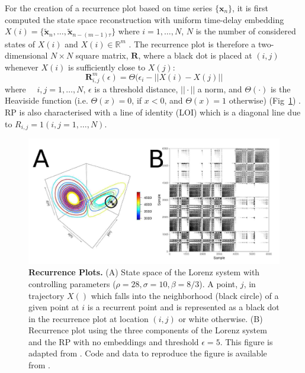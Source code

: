 \documentclass[fleqn,10pt]{wlscirep}
\begin{document}
For the creation of a recurrence plot based on time series 
$\{ \boldsymbol{x}_n \}$, it is first computed the state space 
reconstruction with uniform time-delay embedding 
$X(i)=\{ \boldsymbol{ \tilde{x} }_n, \dots,  
\boldsymbol{ \tilde{x} }_{n -(m-1)\tau} \}$
where $i=1,\dots,N$, $N$ is the number of considered states of $X(i)$ 
and $X(i) \in \mathbb{R}^m$ \cite{eckmann1987}.
The recurrence plot is therefore a two-dimensional $N \times N$ square 
matrix, $\mathbf{R}$, where a black dot is placed at $(i,j)$ 
whenever $X(i)$ is sufficiently close to $X(j)$: 
\begin{equation}
\mathbf{R}^{m}_{i,j} (\epsilon) = \Theta ( \epsilon_i - || X(i) - X(j) ||
\end{equation}
where $\quad i,j=1,\dots,N$, $\epsilon$ is a threshold distance, 
$|| \cdotp ||$ a norm, and $\Theta(\cdotp)$ is the Heaviside 
function (i.e. $\Theta(x)=0$, if $x<0$, and $\Theta(x)=1$ otherwise) 
(Fig~\ref{fig:mrp}) \cite{eckmann1987, marwan2007,marwan2015}.
RP is also characterised with a line of identity (LOI) which is a  
diagonal line due to $ R_{i,j}=1 (i,j=1,\dots,N)$. 
\begin{figure}[ht]
\centering
\includegraphics[width=1.0\textwidth]{figures/methods/rp/pdf/rp}
    \caption{
	{\bf Recurrence Plots.} 
	(A) State space of the Lorenz system with controlling parameters 
	($\rho=28, \sigma=10, \beta=8/3$). 
	A point, $j$, in trajectory $X()$ which falls into the neighborhood 
	(black circle) of a given point at $i$ is a recurrent point and is 
	represented as a black dot in the recurrence plot at location 
	$(i, j)$ or white otherwise.
	(B) Recurrence plot using the 
	three components of the Lorenz system and the RP with no embeddings 
	and threshold $\epsilon=5$.
	This figure is adapted from \cite{marwan2015}.
	Code and data to reproduce the figure is available from \cite{srep2019}.
	}
    \label{fig:mrp}
\end{figure}
\end{document}
